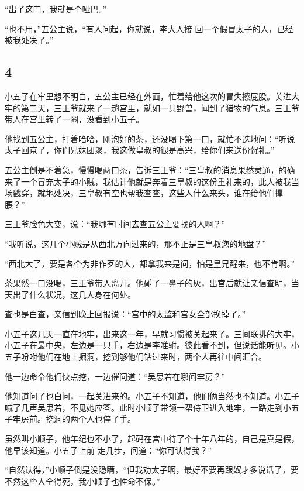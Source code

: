 “出了这门，我就是个哑巴。”

“也不用，”五公主说，“有人问起，你就说，李大人接
回一个假冒太子的人，已经被我处决了。”
\newline

{\centering\subsection{4}}

小五子在牢里想不明白，五公主已经在外面，忙着给他这次的冒失擦屁股。关进大牢的第二天，三王爷就来了一趟宫里，就如一只野兽，闻到了猎物的气息。三王爷带人在宫里转了一圈，没看到小五子。

他找到五公主，打着哈哈，刚泡好的茶，还没喝下第一口，就忙不迭地问：“听说太子回京了，你们兄妹团聚，我这做皇叔的很是高兴，给你们来送份贺礼。”

五公主倒是不着急，慢慢喝两口茶，告诉三王爷：“三皇叔的消息果然灵通，的确来了一个冒充太子的小贼，我估计他就是奔着三皇叔的这份重礼来的，此人被我当场戳穿，就地处决，三皇叔有空也帮我查查，这些人什么来头，谁在给他们撑腰？”

三王爷脸色大变，说：“我哪有时间去查五公主要找的人啊？”

“我听说，这几个小贼是从西北方向过来的，那不正是三皇叔您的地盘？”

“西北大了，要是各个为非作歹的人，都拿我来是问，怕是皇兄醒来，也不肯啊。”

茶果然一口没喝，三王爷带人离开。他碰了一鼻子的灰，出宫后就让亲信查明，当天出了什么状况，这几人身在何处。

查也是白查，亲信到晚上回报说：“宫中的太监和宫女全部换掉了。”
\newline

小五子这几天一直在地牢，出来这一年，早就习惯被关起来了。三间联排的大牢，小五子在最中央，左边是一只手，右边是李准驸。彼此看不到，但说话能听见。小五子吩咐他们在地上掘洞，挖到够他们钻过来时，两个人再往中间汇合。

他一边命令他们快点挖，一边催问道：“吴思若在哪间牢房？”

他知道问了也白问，一起关进来的。小五子不知道，他们俩当然也不知道。小五子喊了几声吴思若，不见她应答。此时小顺子带领一帮侍卫进入地牢，一路走到小五子牢房前。挖洞的两个人也停了手。

虽然叫小顺子，他年纪也不小了，起码在宫中待了个十年八年的，自己是真是假，他早该知道。小五子上前
走几步，问道：“你可认得我？”

“自然认得，”小顺子倒是没隐瞒，“但我劝太子啊，最好不要再跟奴才多说话了，要不然这些人全得死，我小顺子也性命不保。”

